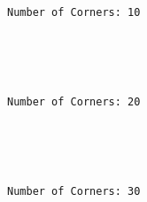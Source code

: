 \documentclass[11pt]{article}
\begin{document}
    \begin{Verbatim}[commandchars=\\\{\}]
Number of Corners: 10
    \end{Verbatim}

    \begin{center}
    \end{center}
    { \hspace*{\fill} \\}
    
    \begin{center}
    \end{center}
    { \hspace*{\fill} \\}
    
    \begin{Verbatim}[commandchars=\\\{\}]
Number of Corners: 20
    \end{Verbatim}

    \begin{center}
    \end{center}
    { \hspace*{\fill} \\}
    
    \begin{center}
    \end{center}
    { \hspace*{\fill} \\}
    
    \begin{Verbatim}[commandchars=\\\{\}]
Number of Corners: 30
    \end{Verbatim}

    \begin{center}
    \end{center}
    { \hspace*{\fill} \\}
    
    \begin{center}
    \end{center}
    { \hspace*{\fill} \\}
    
\end{document}
